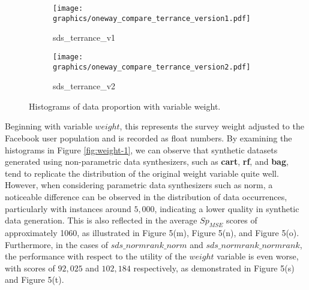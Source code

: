 \newpage
\begin{figure}[H]\ContinuedFloat
\begin{center}
    \begin{subfigure}{0.32\textwidth}
        \centering
        \texttt{[image: graphics/oneway\_compare\_terrance\_version1.pdf]}  
        \caption{sds\_terrance\_v1}
        \label{subfig:terrancev1}
    \end{subfigure}
    \begin{subfigure}{0.32\textwidth}
        \centering
        \texttt{[image: graphics/oneway\_compare\_terrance\_version2.pdf]}  
        \caption{sds\_terrance\_v2}
        \label{subfig:terrancev2}
    \end{subfigure}
\end{center}
    \caption[]{Histograms of data proportion with variable weight.}
    \label{fig:weight-3}
\end{figure}
Beginning with variable $weight$, this represents the survey weight adjusted to the Facebook user population and is recorded as float numbers. By examining the histograms in Figure \ref{fig:weight-1}, we can observe that synthetic datasets generated using non-parametric data synthesizers, such as \textbf{cart}, \textbf{rf}, and \textbf{bag}, tend to replicate the distribution of the original weight variable quite well. However, when considering parametric data synthesizers such as norm, a noticeable difference can be observed in the distribution of data occurrences, particularly with instances around $5,000$, indicating a lower quality in synthetic data generation. This is also reflected in the average $Sp_{MSE}$ scores of approximately 1060, as illustrated in Figure 5(m), Figure 5(n), and Figure 5(o). Furthermore, in the cases of $sds\_normrank\_norm$ and $sds\_normrank\_normrank$, the performance with respect to the utility of the $weight$ variable is even worse, with scores of $92,025$ and $102,184$ respectively, as demonstrated in Figure 5(s) and Figure 5(t).

